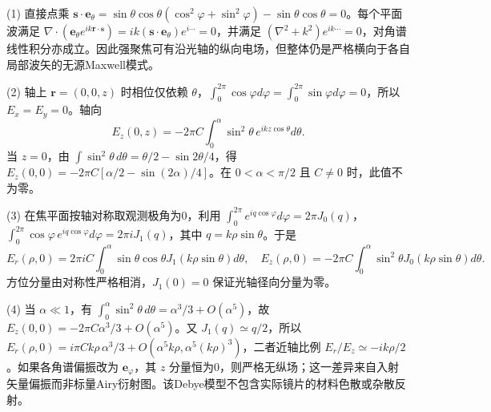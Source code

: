 (1) 直接点乘 \(\boldsymbol s\cdot\boldsymbol e_\theta=\sin\theta\cos\theta(\cos^2\varphi+\sin^2\varphi)-\sin\theta\cos\theta=0\)。每个平面波满足 \(\nabla\cdot(\boldsymbol e_\theta e^{ik\boldsymbol r\cdot\boldsymbol s})=ik(\boldsymbol s\cdot\boldsymbol e_\theta)e^{i\cdots}=0\)，并满足 \((\nabla^2+k^2)e^{ik\cdots}=0\)，对角谱线性积分亦成立。因此强聚焦可有沿光轴的纵向电场，但整体仍是严格横向于各自局部波矢的无源Maxwell模式。

(2) 轴上 \(\boldsymbol r=(0,0,z)\) 时相位仅依赖 \(\theta\)，\(\int_0^{2\pi}\cos\varphi d\varphi=\int_0^{2\pi}\sin\varphi d\varphi=0\)，所以 \(E_x=E_y=0\)。轴向
\[
E_z(0,z)=-2\pi C\int_0^\alpha\sin^2\theta\,e^{ikz\cos\theta}d\theta .
\]
当 \(z=0\)，由 \(\int\sin^2\theta\,d\theta=\theta/2-\sin2\theta/4\)，得
\(\boxed{E_z(0,0)=-2\pi C[\alpha/2-\sin(2\alpha)/4]}\)。在 \(0<\alpha<\pi/2\) 且 \(C\ne0\) 时，此值不为零。

(3) 在焦平面按轴对称取观测极角为0，利用
\(\int_0^{2\pi}e^{iq\cos\varphi}d\varphi=2\pi J_0(q)\)，
\(\int_0^{2\pi}\cos\varphi\,e^{iq\cos\varphi}d\varphi=2\pi iJ_1(q)\)，其中 \(q=k\rho\sin\theta\)。于是
\[
\boxed{E_r(\rho,0)=2\pi iC\int_0^\alpha\sin\theta\cos\theta J_1(k\rho\sin\theta)d\theta},
\quad E_z(\rho,0)=-2\pi C\int_0^\alpha\sin^2\theta J_0(k\rho\sin\theta)d\theta.
\]
方位分量由对称性严格相消，\(J_1(0)=0\) 保证光轴径向分量为零。

(4) 当 \(\alpha\ll1\)，有 \(\int_0^\alpha\sin^2\theta\,d\theta=\alpha^3/3+O(\alpha^5)\)，故 \(E_z(0,0)=-2\pi C\alpha^3/3+O(\alpha^5)\)。又 \(J_1(q)\simeq q/2\)，所以 \(E_r(\rho,0)=i\pi C k\rho\,\alpha^3/3+O(\alpha^5 k\rho,\alpha^5(k\rho)^3)\)，二者近轴比例 \(E_r/E_z\simeq-i k\rho/2\)。如果各角谱偏振改为 \(\boldsymbol e_\varphi\)，其 \(z\) 分量恒为0，则严格无纵场；这一差异来自入射矢量偏振而非标量Airy衍射图。该Debye模型不包含实际镜片的材料色散或杂散反射。
